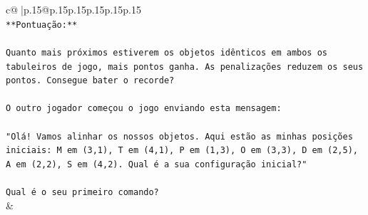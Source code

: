 \documentclass{article}
\begin{document}
{\begin{supertabular}{c@{$\;$}|p{.15\linewidth}@{}p{.15\linewidth}p{.15\linewidth}p{.15\linewidth}p{.15\linewidth}p{.15\linewidth}}
{{{\\ 
\texttt{**Pontuação:**} \\
\\ 
\texttt{Quanto mais próximos estiverem os objetos idênticos em ambos os tabuleiros de jogo, mais pontos ganha. As penalizações reduzem os seus pontos. Consegue bater o recorde?} \\
\\ 
\texttt{O outro jogador começou o jogo enviando esta mensagem:} \\
\\ 
\texttt{"Olá! Vamos alinhar os nossos objetos. Aqui estão as minhas posições iniciais: M em (3,1), T em (4,1), P em (1,3), O em (3,3), D em (2,5), A em (2,2), S em (4,2). Qual é a sua configuração inicial?"} \\
\\ 
\texttt{Qual é o seu primeiro comando?} \\
            }
        }
    }
    & \\ \\


\end{supertabular}}
\end{document}
